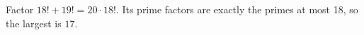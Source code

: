 Factor $18!+19!=20\cdot18!$. Its prime factors are exactly the primes at most 18, so the largest is $\boxed{17}$.

